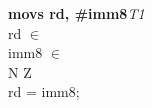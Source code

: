 


\begin{instructionblock}{\imagewidth}%
    \textbf{movs rd, \#imm8}\hfill\textit{T1}\\
    rd $\in$ \baseregisters\\
    imm8 $\in$ \immThree\\
    {N Z}\\
    rd = imm8;
\end{instructionblock}%

